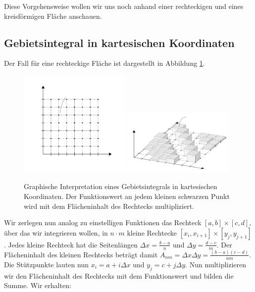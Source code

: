 Diese Vorgehensweise wollen wir uns noch anhand einer rechteckigen und eines kreisförmigen Fläche anschauen.

\subsection{Gebietsintegral in kartesischen Koordinaten}


Der Fall für eine rechteckige Fläche ist dargestellt in Abbildung \ref{fig:AreaIntegCartesian}.

\begin{figure}
    \centering
    \includegraphics[width=0.48\textwidth]{./svg/integral-2d-cartesian}
    \includegraphics[width=0.48\textwidth]{./svg/integral-2d-cartesian-perspective}
    \caption{Graphische Interpretation eines Gebietsintegrals in kartesischen Koordinaten. Der Funktionswert an jedem kleinen schwarzen Punkt wird mit dem Flächeninhalt des Rechtecks multipliziert.}
    \label{fig:AreaIntegCartesian}
\end{figure}

Wir zerlegen nun analog zu einstelligen Funktionen das Rechteck $[a,b] \times [c,d]$, über das wir integrieren wollen, in $n\cdot m $ kleine Rechtecke $[x_i,x_{i+1}] \times [y_j,y_{j+1}]$. Jedes kleine Rechteck hat die Seitenlängen $\Delta x = \frac{b-a}{n}$ und $\Delta y = \frac{d-c}{m}$. Der Flächeninhalt des kleinen Rechtecks beträgt damit $A_{nm} = \Delta x \Delta y = \frac{(b-a)(c-d)}{nm}$. Die Stützpunkte lauten nun $x_i = a + i \Delta x$ und $y_j = c + j \Delta y$.  Nun multiplizieren wir den Flächeninhalt des Rechtecks mit dem Funktionswert und bilden die Summe. Wir erhalten:

